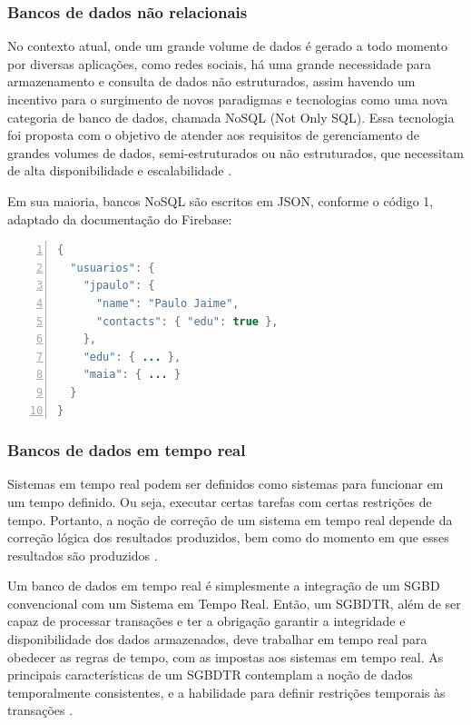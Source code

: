 \subsubsection{Bancos de dados não relacionais}
No contexto atual, onde um grande volume de dados é gerado a todo momento por diversas aplicações, como redes sociais, há uma grande necessidade para armazenamento e consulta de dados não estruturados, assim havendo um incentivo para o surgimento de novos paradigmas e tecnologias como uma nova categoria de banco de dados, chamada NoSQL (Not Only SQL). Essa tecnologia foi proposta com o objetivo de atender aos requisitos de gerenciamento de grandes volumes de dados, semi-estruturados ou não estruturados, que necessitam de alta disponibilidade e escalabilidade \citep{loscio_oliveira_pontes_nosql_2015}.

Em sua maioria, bancos NoSQL são escritos em JSON, conforme o código 1, adaptado da documentação do Firebase:
\begin{lstlisting}[numbers=left, language=Java, style=mycode, caption={Exemplo de modelagem JSON em Firebase.}, label={lst:firebase-code}]
{
  "usuarios": {
    "jpaulo": {
      "name": "Paulo Jaime",
      "contacts": { "edu": true },
    },
    "edu": { ... },
    "maia": { ... }
  }
}
\end{lstlisting}
\justifying\setlength{\parindent}{1,25cm} 

\subsubsection{Bancos de dados em tempo real}

Sistemas em tempo real podem ser definidos como sistemas para funcionar em um tempo definido. Ou seja, executar certas tarefas com certas restrições de tempo. Portanto, a noção de correção de um sistema em tempo real depende da correção lógica dos resultados produzidos, bem como do momento em que esses resultados são produzidos \citep{realtime_db}.

Um banco de dados em tempo real é simplesmente a integração de um SGBD convencional com um Sistema em Tempo Real. Então, um SGBDTR, além de ser capaz de processar transações e ter a obrigação garantir a integridade e disponibilidade dos dados armazenados, deve trabalhar em tempo real para obedecer as regras de tempo, com as impostas aos sistemas em tempo real. As principais características de um SGBDTR contemplam a noção de dados temporalmente consistentes, e a habilidade para definir restrições temporais às transações \citep{mod_sgbdtr}. 

